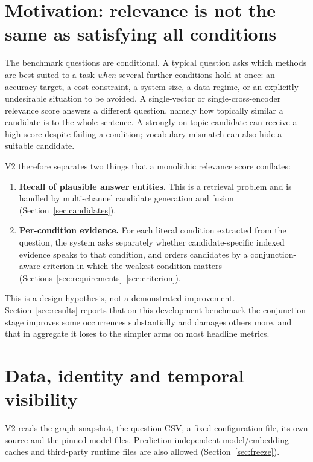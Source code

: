 \documentclass[11pt,a4paper]{article}
\begin{document}
\section{Motivation: relevance is not the same as satisfying all conditions}
\label{sec:motivation}

The benchmark questions are conditional. A typical question asks which methods are best suited to a task \emph{when} several further conditions hold at once: an accuracy target, a cost constraint, a system size, a data regime, or an explicitly undesirable situation to be avoided. A single-vector or single-cross-encoder relevance score answers a different question, namely how topically similar a candidate is to the whole sentence. A strongly on-topic candidate can receive a high score despite failing a condition; vocabulary mismatch can also hide a suitable candidate.

V2 therefore separates two things that a monolithic relevance score conflates:

\begin{enumerate}
\item \textbf{Recall of plausible answer entities.} This is a retrieval problem and is handled by multi-channel candidate generation and fusion (Section~\ref{sec:candidates}).
\item \textbf{Per-condition evidence.} For each literal condition extracted from the question, the system asks separately whether candidate-specific indexed evidence speaks to that condition, and orders candidates by a conjunction-aware criterion in which the weakest condition matters (Sections~\ref{sec:requirements}--\ref{sec:criterion}).
\end{enumerate}

This is a design hypothesis, not a demonstrated improvement. Section~\ref{sec:results} reports that on this development benchmark the conjunction stage improves some occurrences substantially and damages others more, and that in aggregate it loses to the simpler arms on most headline metrics.

\section{Data, identity and temporal visibility}
\label{sec:data}

V2 reads the graph snapshot, the question CSV, a fixed configuration file, its own source and the pinned model files. Prediction-independent model/embedding caches and third-party runtime files are also allowed (Section~\ref{sec:freeze}).
\end{document}
